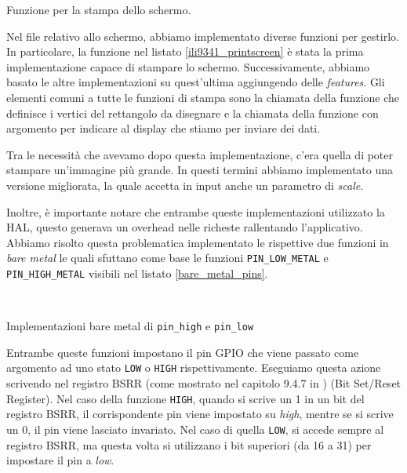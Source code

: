 \documentclass[a4paper]{article}
\begin{document}
\begin{Listing}[h!t] %
    \centering
    \caption{Funzione per la stampa dello schermo.}
    \label{ili9341_printscreen}
\end{Listing}

Nel file relativo allo schermo, abbiamo implementato diverse funzioni per gestirlo. In particolare, la funzione nel listato \ref{ili9341_printscreen} è stata la prima implementazione capace di stampare lo schermo. Successivamente, abbiamo basato le altre implementazioni su quest'ultima aggiungendo delle \textit{features}.
Gli elementi comuni a tutte le funzioni di stampa sono la chiamata della funzione {} che definisce i vertici del rettangolo da disegnare e la chiamata della funzione  con argomento {} per indicare al display che stiamo per inviare dei dati.

Tra le necessità che avevamo dopo questa implementazione, c'era quella di poter stampare un'immagine più grande. In questi termini abbiamo implementato una versione migliorata, la quale accetta in input anche un parametro di \textit{scale}.

Inoltre, è importante notare che entrambe queste implementazioni utilizzato la HAL, questo generava un overhead nelle richeste rallentando l'applicativo. Abbiamo risolto questa problematica implementato le rispettive due funzioni in \textit{bare metal} le quali sfuttano come base le funzioni \texttt{PIN\_LOW\_METAL} e \texttt{PIN\_HIGH\_METAL} visibili nel listato \ref{bare_metal_pins}.

\begin{Listing}
    \centering
    \mbox{
        \quad
    }
    \caption{Implementazioni bare metal di \texttt{pin\_high} e \texttt{pin\_low}}
    \label{bare_metal_pins}
\end{Listing}

Entrambe queste funzioni impostano il pin GPIO che viene passato come argomento ad uno stato \texttt{LOW} o \texttt{HIGH} rispettivamente.  Eseguiamo questa azione scrivendo nel registro BSRR (come mostrato nel capitolo 9.4.7 in \cite{STM32F334xx}) (Bit Set/Reset Register). Nel caso della funzione \texttt{HIGH}, quando si scrive un 1 in un bit del registro BSRR, il corrispondente pin viene impostato su \textit{high}, mentre se si scrive un 0, il pin viene lasciato invariato. Nel caso di quella \texttt{LOW}, si accede sempre al registro BSRR, ma questa volta si utilizzano i bit superiori (da 16 a 31) per impostare il pin a \textit{low}.
\end{document}
